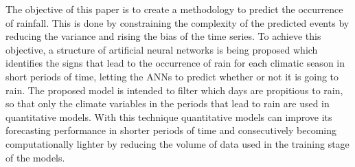 The objective of this paper is to create a methodology to predict the occurrence of rainfall. This is done by constraining the complexity of the predicted events by reducing the variance and rising the bias of the time series. To achieve this objective, a structure of artificial neural networks is being proposed which identifies the signs that lead to the occurrence of rain for each climatic season in short periods of time, letting the ANNs to predict whether or not it is going to rain. The proposed model is intended to filter which days are propitious to rain, so that only the climate variables in the periods that lead to rain are used in quantitative models. With this technique quantitative models can improve its forecasting performance in shorter periods of time and consecutively becoming computationally lighter by reducing the volume of data used in the training stage of the models. 





